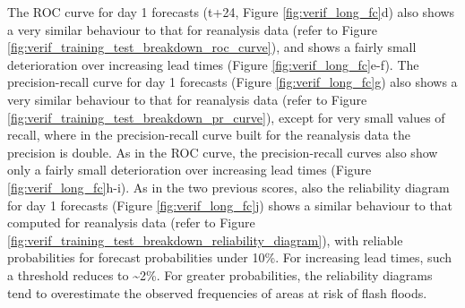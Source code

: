 The  ROC curve for day 1 forecasts (t+24, Figure \ref{fig:verif_long_fc}d) also shows a very similar behaviour to that for reanalysis data (refer to Figure \ref{fig:verif_training_test_breakdown_roc_curve}), and shows a fairly small deterioration over increasing lead times (Figure \ref{fig:verif_long_fc}e-f). The precision-recall curve for day 1 forecasts (Figure \ref{fig:verif_long_fc}g) also shows a very similar behaviour to that for reanalysis data (refer to Figure \ref{fig:verif_training_test_breakdown_pr_curve}), except for very small values of recall, where in the precision-recall curve built for the reanalysis data the precision is double. As in the ROC curve, the precision-recall curves also show only a fairly small deterioration over increasing lead times (Figure \ref{fig:verif_long_fc}h-i). As in the two previous scores, also the reliability diagram for day 1 forecasts (Figure \ref{fig:verif_long_fc}j) shows a similar behaviour to that computed for reanalysis data (refer to Figure \ref{fig:verif_training_test_breakdown_reliability_diagram}), with reliable probabilities for forecast probabilities under 10\%. For increasing lead times, such a threshold reduces to \sim2\%. For greater probabilities, the reliability diagrams tend to overestimate the observed frequencies of areas at risk of flash floods. 

